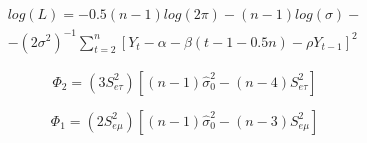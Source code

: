 \documentclass[a4paper,12pt]{article}
\begin{document}
	\begin{align*}
	\label{eq:likefun}
	log{(L)}=-0.5(n-1)log(2\pi)-(n-1)log{(\sigma)}-\\-(2\sigma^2)^{-1}\sum_{t=2}^{n}
	\left[Y_t-\alpha-\beta(t-1-0.5n)-\rho Y_{t-1}\right]^2
	\end{align*}

	\begin{equation}
		\label{eq:phi2}
		\Phi_2=(3S^2_{e\tau})\left[(n-1)\hat{\sigma}_0^2-(n-4)S^2_{e\tau}\right]
	\end{equation}

	\begin{equation}
	\Phi_1=(2S^2_{e\mu})\left[(n-1)\hat{\sigma}_0^2-(n-3)S^2_{e\mu}\right]
	\end{equation}
\end{document}
